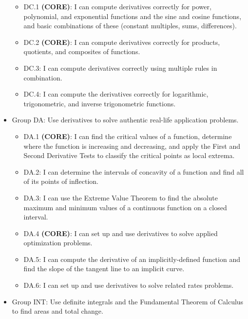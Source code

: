 \documentclass[]{article}
\providecommand{\tightlist}{%
  \setlength{\itemsep}{0pt}\setlength{\parskip}{0pt}}
\begin{document}
\begin{itemize}
  \begin{itemize}
  \tightlist
  \item
    DC.1 \textbf{(CORE)}: I can compute derivatives correctly for power,
    polynomial, and exponential functions and the sine and cosine
    functions, and basic combinations of these (constant multiples,
    sums, differences).
  \item
    DC.2 \textbf{(CORE)}: I can compute derivatives correctly for
    products, quotients, and composites of functions.
  \item
    DC.3: I can compute derivatives correctly using multiple rules in
    combination.
  \item
    DC.4: I can compute the derivatives correctly for logarithmic,
    trigonometric, and inverse trigonometric functions.
  \end{itemize}
\item
  Group DA: Use derivatives to solve authentic real-life application
  problems.

  \begin{itemize}
  \tightlist
  \item
    DA.1 \textbf{(CORE)}: I can find the critical values of a function,
    determine where the function is increasing and decreasing, and apply
    the First and Second Derivative Tests to classify the critical
    points as local extrema.
  \item
    DA.2: I can determine the intervals of concavity of a function and
    find all of its points of inflection.
  \item
    DA.3: I can use the Extreme Value Theorem to find the absolute
    maximum and minimum values of a continuous function on a closed
    interval.
  \item
    DA.4 \textbf{(CORE)}: I can set up and use derivatives to solve
    applied optimization problems.
  \item
    DA.5: I can compute the derivative of an implicitly-defined function
    and find the slope of the tangent line to an implicit curve.
  \item
    DA.6: I can set up and use derivatives to solve related rates
    problems.
  \end{itemize}
\item
  Group INT: Use definite integrals and the Fundamental Theorem of
  Calculus to find areas and total change.


\end{itemize}
\end{document}
